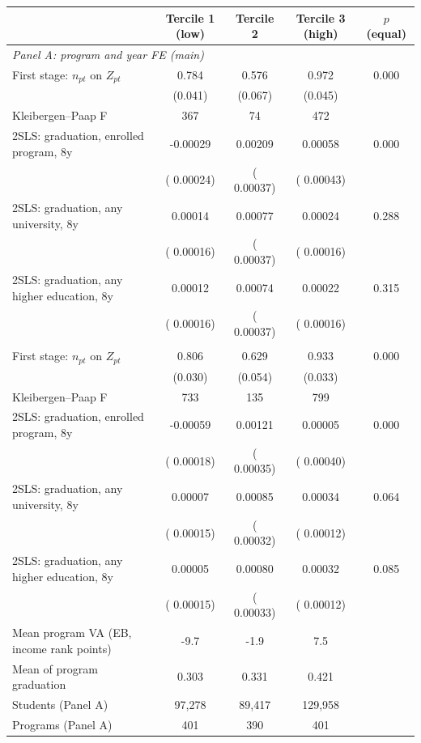 \begin{tabular}{lcccc}
\toprule
 & Tercile 1 (low) & Tercile 2 & Tercile 3 (high) & \(p\) (equal) \\
\midrule
\multicolumn{5}{l}{\textit{Panel A: program and year FE (main)}} \\
First stage: \(n_{pt}\) on \(Z_{pt}\) &  0.784\sym{***} &  0.576\sym{***} &  0.972\sym{***} & 0.000 \\
 & (0.041) & (0.067) & (0.045) & \\
Kleibergen--Paap F &    367 &     74 &    472 & \\
2SLS: graduation, enrolled program, 8y & -0.00029 &  0.00209\sym{***} &  0.00058 & 0.000 \\
 & ( 0.00024) & ( 0.00037) & ( 0.00043) & \\
2SLS: graduation, any university, 8y &  0.00014 &  0.00077\sym{**} &  0.00024 & 0.288 \\
 & ( 0.00016) & ( 0.00037) & ( 0.00016) & \\
2SLS: graduation, any higher education, 8y &  0.00012 &  0.00074\sym{**} &  0.00022 & 0.315 \\
 & ( 0.00016) & ( 0.00037) & ( 0.00016) & \\
\addlinespace
\multicolumn{5}{l}{\textit{Panel B: program and university \(\times\) year FE}} \\
First stage: \(n_{pt}\) on \(Z_{pt}\) &  0.806\sym{***} &  0.629\sym{***} &  0.933\sym{***} & 0.000 \\
 & (0.030) & (0.054) & (0.033) & \\
Kleibergen--Paap F &    733 &    135 &    799 & \\
2SLS: graduation, enrolled program, 8y & -0.00059\sym{***} &  0.00121\sym{***} &  0.00005 & 0.000 \\
 & ( 0.00018) & ( 0.00035) & ( 0.00040) & \\
2SLS: graduation, any university, 8y &  0.00007 &  0.00085\sym{***} &  0.00034\sym{***} & 0.064 \\
 & ( 0.00015) & ( 0.00032) & ( 0.00012) & \\
2SLS: graduation, any higher education, 8y &  0.00005 &  0.00080\sym{**} &  0.00032\sym{***} & 0.085 \\
 & ( 0.00015) & ( 0.00033) & ( 0.00012) & \\
\midrule
Mean program VA (EB, income rank points) &  -9.7 &  -1.9 &   7.5 & \\
Mean of program graduation & 0.303 & 0.331 & 0.421 & \\
Students (Panel A) &    97,278 &    89,417 &   129,958 & \\
Programs (Panel A) &    401 &    390 &    401 & \\
\bottomrule
\end{tabular}
